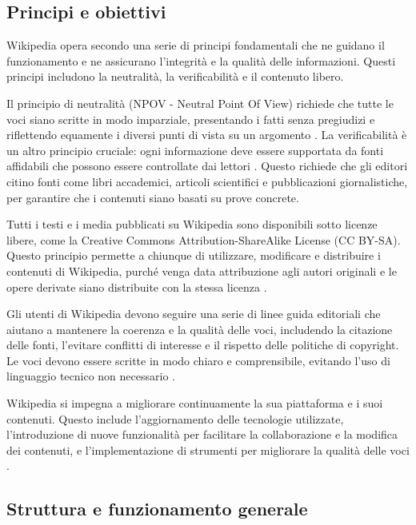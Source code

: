 \documentclass[12pt,a4paper]{report}
\begin{document}
\subsection{Principi e obiettivi}

Wikipedia opera secondo una serie di principi fondamentali che ne guidano il funzionamento e ne assicurano l'integrità e la qualità delle informazioni. Questi principi includono la neutralità, la verificabilità e il contenuto libero.

Il principio di neutralità (NPOV - Neutral Point Of View) richiede che tutte le voci siano scritte in modo imparziale, presentando i fatti senza pregiudizi e riflettendo equamente i diversi punti di vista su un argomento \cite{reagle2010good}. La verificabilità è un altro principio cruciale: ogni informazione deve essere supportata da fonti affidabili che possono essere controllate dai lettori \cite{denning2005wikipedia}. Questo richiede che gli editori citino fonti come libri accademici, articoli scientifici e pubblicazioni giornalistiche, per garantire che i contenuti siano basati su prove concrete.

Tutti i testi e i media pubblicati su Wikipedia sono disponibili sotto licenze libere, come la Creative Commons Attribution-ShareAlike License (CC BY-SA). Questo principio permette a chiunque di utilizzare, modificare e distribuire i contenuti di Wikipedia, purché venga data attribuzione agli autori originali e le opere derivate siano distribuite con la stessa licenza \cite{jemielniak2014wikipedia}.

Gli utenti di Wikipedia devono seguire una serie di linee guida editoriali che aiutano a mantenere la coerenza e la qualità delle voci, includendo la citazione delle fonti, l'evitare conflitti di interesse e il rispetto delle politiche di copyright. Le voci devono essere scritte in modo chiaro e comprensibile, evitando l'uso di linguaggio tecnico non necessario \cite{reagle2010good}.

Wikipedia si impegna a migliorare continuamente la sua piattaforma e i suoi contenuti. Questo include l'aggiornamento delle tecnologie utilizzate, l'introduzione di nuove funzionalità per facilitare la collaborazione e la modifica dei contenuti, e l'implementazione di strumenti per migliorare la qualità delle voci \cite{history_of_wikis}.

\subsection{Struttura e funzionamento generale}
\end{document}
